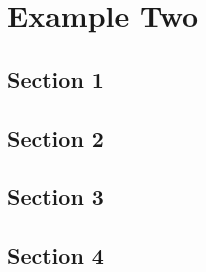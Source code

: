 \cleardoublepage
\chapter{Example Two}


\section{Section 1}
\blindmathpaper
\section{Section 2}
\blindmathpaper
\section{Section 3}
\blindmathpaper
\section{Section 4}
\blindmathpaper
